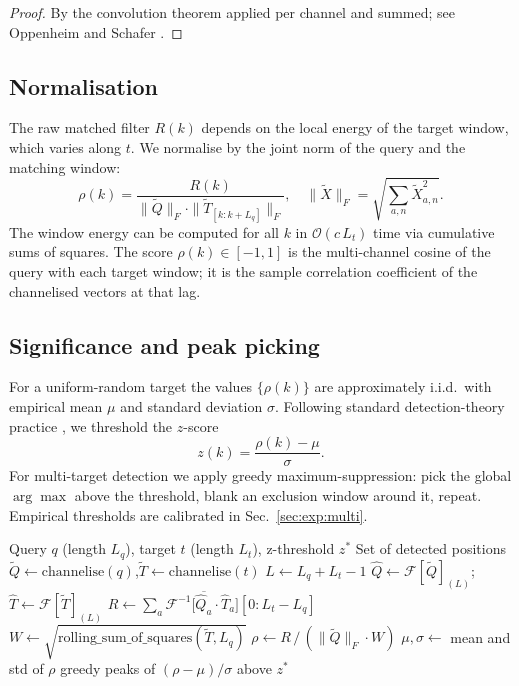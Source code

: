 \documentclass[11pt,a4paper]{article}
\theoremstyle{definition}
\theoremstyle{remark}
\newcommand{\bigO}{\mathcal{O}}
\newcommand{\F}{\mathcal{F}}
\begin{document}
\begin{proof}
By the convolution theorem applied per channel and summed; see
Oppenheim and Schafer \citep[\S 8.7]{oppenheim2009}.
\end{proof}

\subsection{Normalisation}

The raw matched filter $R(k)$ depends on the local energy of the target
window, which varies along $t$. We normalise by the joint norm of the
query and the matching window:
\begin{equation}
    \rho(k) = \frac{R(k)}{\|\tilde Q\|_F \cdot \|\tilde T_{[k:k+L_q]}\|_F},
    \quad
    \|\tilde X\|_F = \sqrt{\sum_{a, n} \tilde X_{a, n}^2}.
    \label{eq:rho}
\end{equation}
The window energy can be computed for all $k$ in $\bigO(c \, L_t)$ time
via cumulative sums of squares. The score $\rho(k) \in [-1, 1]$ is the
multi-channel cosine of the query with each target window; it is the
sample correlation coefficient of the channelised vectors at that lag.

\subsection{Significance and peak picking}

For a uniform-random target the values $\{\rho(k)\}$ are approximately
i.i.d.\ with empirical mean $\mu$ and standard deviation $\sigma$.
Following standard detection-theory practice
\citep{neyman1933, kay1998}, we threshold the $z$-score
\begin{equation}
    z(k) = \frac{\rho(k) - \mu}{\sigma}.
\end{equation}
For multi-target detection we apply greedy maximum-suppression: pick the
global $\arg\max$ above the threshold, blank an exclusion window around
it, repeat. Empirical thresholds are calibrated in
Sec.~\ref{sec:exp:multi}.

\begin{algorithm}[t]
\caption{Multi-channel matched filter for sequence matching.}
\label{alg:filter}
\begin{algorithmic}[1]
\Require Query $q$ (length $L_q$), target $t$ (length $L_t$), z-threshold $z^*$
\Ensure Set of detected positions
\State $\tilde Q \gets \mathrm{channelise}(q)$,\quad $\tilde T \gets \mathrm{channelise}(t)$
\State $L \gets L_q + L_t - 1$
\State $\hat Q \gets \F[\tilde Q]_{(L)}$;\quad $\hat T \gets \F[\tilde T]_{(L)}$
\State $R \gets \sum_a \F^{-1}\!\big[\overline{\hat Q_a} \cdot \hat T_a\big][0 : L_t - L_q]$
\State $W \gets \sqrt{\mathrm{rolling\_sum\_of\_squares}(\tilde T, L_q)}$
\State $\rho \gets R \,/\, (\|\tilde Q\|_F \cdot W)$
\State $\mu, \sigma \gets$ mean and std of $\rho$
\State \Return greedy peaks of $(\rho - \mu)/\sigma$ above $z^*$
\end{algorithmic}
\end{algorithm}
\end{document}

